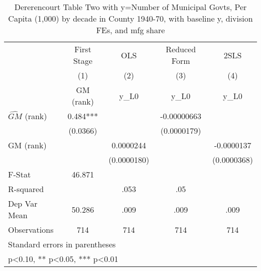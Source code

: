\begin{table}[htbp]\centering
\def\sym#1{\ifmmode^{#1}\else\(^{#1}\)\fi}
\caption{Dererencourt Table Two with y=Number of Municipal Govts, Per Capita (1,000) by decade in County 1940-70, with baseline y, division FEs, and mfg share}
\begin{tabular}{l*{4}{c}}
\toprule
                    & First Stage   &         OLS   &Reduced Form   &        2SLS   \\
                    &\multicolumn{1}{c}{(1)}&\multicolumn{1}{c}{(2)}&\multicolumn{1}{c}{(3)}&\multicolumn{1}{c}{(4)}\\
                    &\multicolumn{1}{c}{GM  (rank)}&\multicolumn{1}{c}{y\_L0}&\multicolumn{1}{c}{y\_L0}&\multicolumn{1}{c}{y\_L0}\\
\midrule
$\hat{GM}$ (rank)   &       0.484***&               & -0.00000663   &               \\
                    &    (0.0366)   &               & (0.0000179)   &               \\
\addlinespace
GM  (rank)          &               &   0.0000244   &               &  -0.0000137   \\
                    &               & (0.0000180)   &               & (0.0000368)   \\
\midrule
F-Stat              &      46.871   &               &               &               \\
R-squared           &               &        .053   &         .05   &               \\
Dep Var Mean        &      50.286   &        .009   &        .009   &        .009   \\
Observations        &         714   &         714   &         714   &         714   \\
\bottomrule
\multicolumn{5}{l}{\footnotesize Standard errors in parentheses}\\
\multicolumn{5}{l}{\footnotesize * p<0.10, ** p<0.05, *** p<0.01}\\
\end{tabular}
\end{table}
